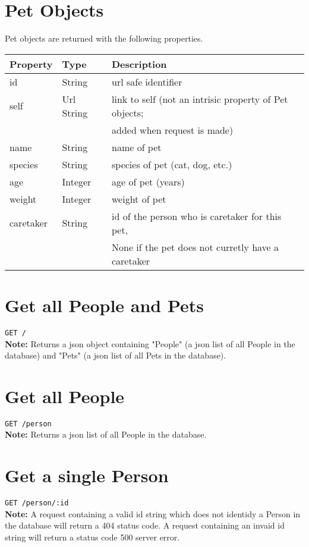 \documentclass{article}
\begin{document}
\section*{Pet Objects}
Pet objects are returned with the following properties. \\
\begin{tabular}{| l | l | l |}
	\hline
	\textbf{Property}     & \textbf{Type}   & \textbf{Description} \\
	\hline
	id                    & String          & url safe identifier \\
	\hline
	self                  & Url String      & link to self (not an intrisic property of Pet objects; \\
	                      &                 & added when request is made) \\
	\hline
	name		      & String          & name of pet \\
	\hline
	species               & String          & species of pet (cat, dog, etc.) \\
	\hline
	age                   & Integer	        & age of pet (years) \\
	\hline
	weight                & Integer         & weight of pet \\
	\hline
	caretaker             & String          & id of the person who is caretaker for this pet, \\
	                      &                 & None if the pet does not curretly have a caretaker \\
	\hline
\end{tabular}

\section*{Get all People and Pets}
\texttt{GET /} \\
\textbf{Note:} Returns a json object containing "People" (a json list of all People in the
database) and "Pets" (a json list of all Pets in the database).

\section*{Get all People}
\texttt{GET /person} \\
\textbf{Note:} Returns a json list of all People in the database.

\section*{Get a single Person}
\texttt{GET /person/:id} \\
\textbf{Note:} A request containing a valid id string which does not
identidy a Person in the database will return a 404 status code. A request
containing an invaid id string will return a status code 500 server error.
\end{document}
